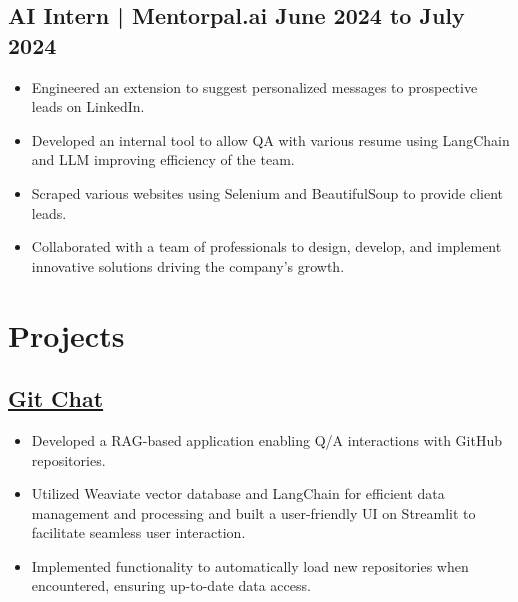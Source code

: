 \documentclass[a4paper,11pt]{article}
\begin{document}
\subsection{AI Intern | Mentorpal.ai 
\hfill June 2024 to July 2024}
\begin{itemize}[itemsep=0pt,parsep=0pt,topsep=0pt,partopsep=0pt]
    \item Engineered an extension to suggest personalized messages to prospective leads on LinkedIn.
    \item Developed an internal tool to allow QA with various resume using LangChain and LLM improving efficiency of the team.
    \item Scraped various websites using Selenium and BeautifulSoup to provide client leads.
    \item Collaborated with a team of professionals to design, develop, and implement innovative solutions driving the company’s growth.
\end{itemize}
\vspace{-5mm}

\section*{Projects}
\vspace{-2mm}
\subsection*{\href{https://github.com/kanakOS01/git-chat}{Git Chat}}
\begin{itemize}[itemsep=0pt,parsep=0pt,topsep=0pt,partopsep=0pt]
    \item Developed a RAG-based application enabling Q/A interactions with GitHub repositories.
    \item Utilized Weaviate vector database and LangChain for efficient data management and processing and built a user-friendly UI on Streamlit to facilitate seamless user interaction.
    \item Implemented functionality to automatically load new repositories when encountered, ensuring up-to-date data access.
\end{itemize}
\vspace{-3mm}
\end{document}
